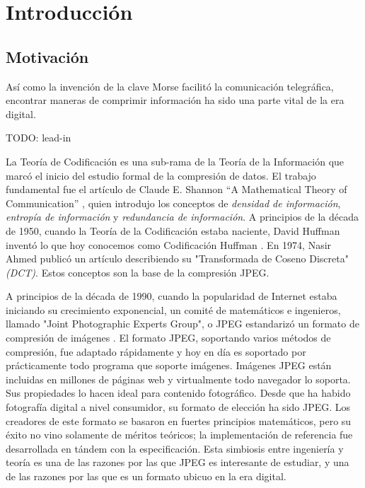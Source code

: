 \chapter{Introducción}\label{ch:introduction}


\section{Motivación}

Así como la invención de la clave Morse facilitó la comunicación telegráfica, encontrar maneras de comprimir información ha sido una parte vital de la era digital.

TODO: lead-in

La Teoría de Codificación es una sub-rama de la Teoría de la Información que marcó el inicio del estudio formal de la compresión de datos. El trabajo fundamental fue el artículo de Claude E. Shannon ``A Mathematical Theory of Communication'' \citep{shannon}, quien introdujo los conceptos de \emph{densidad de información}, \emph{entropía de información} y \emph{redundancia de información}. A principios de la década de 1950, cuando la Teoría de la Codificación estaba naciente, David Huffman inventó lo que hoy conocemos como Codificación Huffman \citep{Huffman}. En 1974, Nasir Ahmed publicó un artículo describiendo su "Transformada de Coseno Discreta" \emph{(DCT)}. Estos conceptos son la base de la compresión JPEG.

A principios de la década de 1990, cuando la popularidad de Internet estaba iniciando su crecimiento exponencial, un comité de matemáticos e ingenieros, llamado "Joint Photographic Experts Group", o JPEG estandarizó un formato de compresión de imágenes \citep{JPEGSTD}. El formato JPEG, soportando varios métodos de compresión, fue adaptado rápidamente y hoy en día es soportado por prácticamente todo programa que soporte imágenes. Imágenes JPEG están incluidas en millones de páginas web y virtualmente todo navegador lo soporta. Sus propiedades lo hacen ideal para contenido fotográfico. Desde que ha habido fotografía digital a nivel consumidor, su formato de elección ha sido JPEG. Los creadores de este formato se basaron en fuertes principios matemáticos, pero su éxito no vino solamente de méritos teóricos; la implementación de referencia fue desarrollada en tándem con la especificación. Esta simbiosis entre ingeniería y teoría es una de las razones por las que JPEG es interesante de estudiar, y una de las razones por las que es un formato ubicuo en la era digital.

